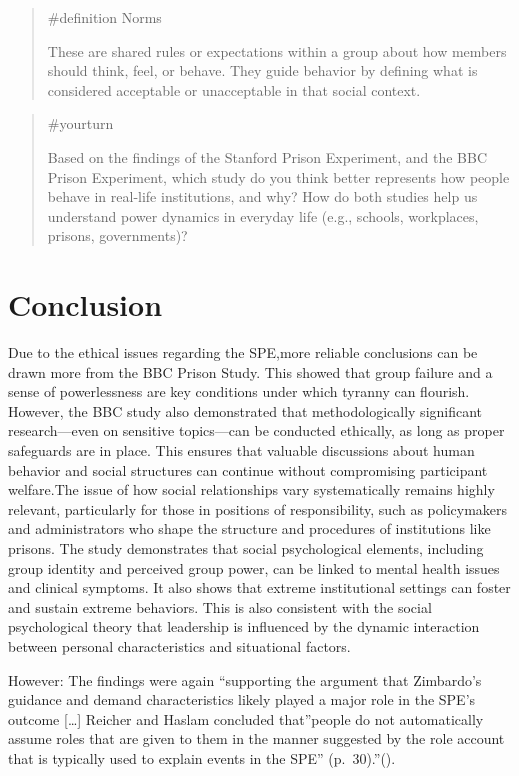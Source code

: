 \documentclass[
  letterpaper,
]{book}
\begin{document}
\begin{quote}
\label{def-norms}{\#definition} Norms

These are shared rules or expectations within a group about how members
should think, feel, or behave. They guide behavior by defining what is
considered acceptable or unacceptable in that social context.
\end{quote}

\begin{quote}
{\#yourturn}

Based on the findings of the Stanford Prison Experiment, and the BBC
Prison Experiment, which study do you think better represents how people
behave in real-life institutions, and why? How do both studies help us
understand power dynamics in everyday life (e.g., schools, workplaces,
prisons, governments)?
\end{quote}

\section{Conclusion}\label{conclusion-12}

Due to the ethical issues regarding the SPE,more reliable conclusions
can be drawn more from the BBC Prison Study. This showed that group
failure and a sense of powerlessness are key conditions under which
tyranny can flourish. However, the BBC study also demonstrated that
methodologically significant research---even on sensitive topics---can
be conducted ethically, as long as proper safeguards are in place. This
ensures that valuable discussions about human behavior and social
structures can continue without compromising participant welfare.The
issue of how social relationships vary systematically remains highly
relevant, particularly for those in positions of responsibility, such as
policymakers and administrators who shape the structure and procedures
of institutions like prisons. The study demonstrates that social
psychological elements, including group identity and perceived group
power, can be linked to mental health issues and clinical symptoms. It
also shows that extreme institutional settings can foster and sustain
extreme behaviors. This is also consistent with the social psychological
theory that leadership is influenced by the dynamic interaction between
personal characteristics and situational factors.

However: The findings were again ``supporting the argument that
Zimbardo's guidance and demand characteristics likely played a major
role in the SPE's outcome {[}\ldots{]} Reicher and Haslam concluded
that''people do not automatically assume roles that are given to them in
the manner suggested by the role account that is typically used to
explain events in the SPE''
(p.~30).''().
\end{document}
